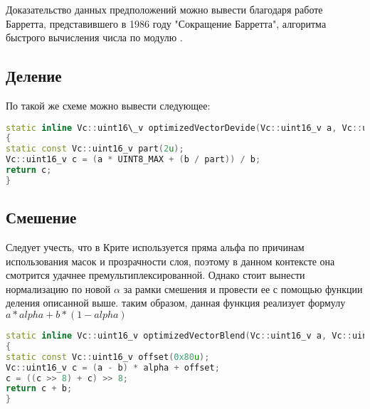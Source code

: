 Доказательство данных  предположений можно вывести благодаря работе Барретта, представившего в 1986 году  "Сокращение Барретта", алгоритма быстрого вычисления числа по модулю \cite{bib7}.


\subsection{Деление}
По такой же схеме можно вывести следующее:
\begin{lstlisting}[language=c++]
static inline Vc::uint16\_v optimizedVectorDevide(Vc::uint16_v a, Vc::uint16_v b)
{
static const Vc::uint16_v part(2u);
Vc::uint16_v c = (a * UINT8_MAX + (b / part)) / b;
return c;
}
\end{lstlisting}

\subsection{Смешение}
Следует учесть, что в Крите используется пряма альфа по причинам использования масок и прозрачности слоя, поэтому в данном контексте она смотрится удачнее премультиплексированной. Однако стоит вынести нормализацию по новой $\alpha$ за рамки смешения и провести ее с помощью функции деления описанной выше. таким образом, данная функция реализует формулу $a*alpha + b*(1-alpha)$
\begin{lstlisting}[language=c++]
static inline Vc::uint16_v optimizedVectorBlend(Vc::uint16_v a, Vc::uint16_v b, Vc::uint16_v alpha)
{
static const Vc::uint16_v offset(0x80u);
Vc::uint16_v c = (a - b) * alpha + offset;
c = ((c >> 8) + c) >> 8;
return c + b;
}

\end{lstlisting}


